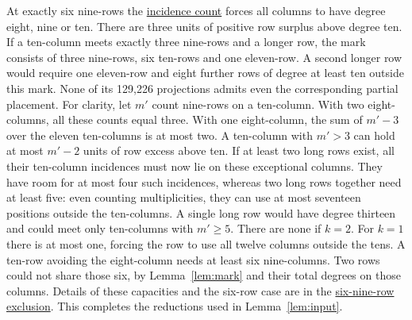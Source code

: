 \documentclass[11pt]{article}
\newcommand{\proofdir}[2]{\href{https://github.com/jasondavies/zarankiewicz-numbers/blob/b33dcd207d62331adc02e1cb6ef0021094ebd40b/#1}{#2}}
\begin{document}
At exactly six nine-rows the \proofdir{z22x23-k33/six-nine-rows.md}{incidence
count} forces all columns to have degree eight, nine or ten. There are
three units of positive row surplus above degree ten. If a ten-column
meets exactly three nine-rows and a longer row, the mark consists of
three nine-rows, six ten-rows and one eleven-row. A second longer row
would require one eleven-row and eight further rows of degree at least
ten outside this mark. None of its 129,226 projections admits even the
corresponding partial placement. For clarity, let $m'$ count nine-rows on a ten-column. With two
eight-columns, all these counts equal three. With one eight-column,
the sum of $m'-3$ over the eleven ten-columns is at most two.
A ten-column with $m'>3$ can hold at most $m'-2$ units of row excess
above ten. If at least two long rows exist, all their ten-column
incidences must now lie on these exceptional columns. They have room
for at most four such incidences, whereas two long rows together need
at least five: even counting multiplicities, they can use at most
seventeen positions outside the ten-columns. A single long row would
have degree thirteen and could meet only ten-columns with $m'\ge5$.
There are none if $k=2$. For $k=1$ there is at most one, forcing the
row to use all twelve columns outside the tens. A ten-row avoiding the
eight-column needs at least six nine-columns. Two rows could not share
those six, by Lemma~\ref{lem:mark} and their total degrees on those
columns. Details of these capacities and the six-row case are in the
\proofdir{z22x23-k33/seven-nine-rows.md}{six-nine-row exclusion}.
This completes the reductions used in Lemma~\ref{lem:input}.
\end{document}

